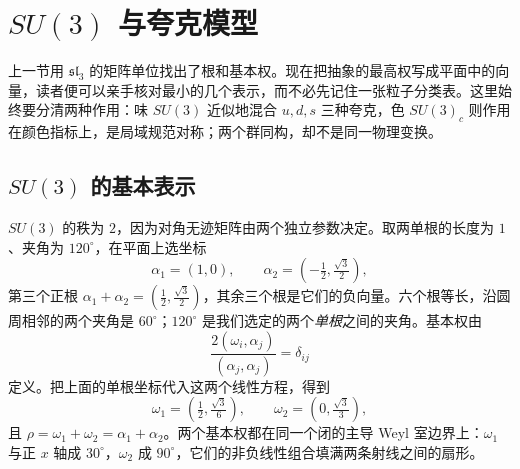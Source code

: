 \section{\texorpdfstring{$SU(3)$ 与夸克模型}{SU(3) 与夸克模型}}
\label{chap:su3-quarks}

上一节用 \(\mathfrak{sl}_3\) 的矩阵单位找出了根和基本权。现在把抽象的最高权写成平面中的向量，读者便可以亲手核对最小的几个表示，而不必先记住一张粒子分类表。这里始终要分清两种作用：味 \(SU(3)\) 近似地混合 \(u,d,s\) 三种夸克，色 \(SU(3)_c\) 则作用在颜色指标上，是局域规范对称；两个群同构，却不是同一物理变换。

\subsection{\texorpdfstring{$SU(3)$ 的基本表示}{SU(3) 的基本表示}}

\begin{definition}[$SU(3)$ 的根坐标与基本权]
$SU(3)$ 的秩为 $2$，因为对角无迹矩阵由两个独立参数决定。取两单根的长度为 $1$、夹角为 $120^\circ$，在平面上选坐标
\[
\alpha_1=(1,0),\qquad \alpha_2=\left(-\tfrac12,\tfrac{\sqrt3}{2}\right),
\]
第三个正根 $\alpha_1+\alpha_2=(\tfrac12,\tfrac{\sqrt3}{2})$，其余三个根是它们的负向量。六个根等长，沿圆周相邻的两个夹角是 $60^\circ$；$120^\circ$ 是我们选定的两个\emph{单根}之间的夹角。基本权由
\[
\frac{2(\omega_i,\alpha_j)}{(\alpha_j,\alpha_j)}=\delta_{ij}
\]
定义。把上面的单根坐标代入这两个线性方程，得到
\[
\omega_1=\left(\tfrac12,\tfrac{\sqrt3}{6}\right),\qquad
\omega_2=\left(0,\tfrac{\sqrt3}{3}\right),
\]
且 $\rho=\omega_1+\omega_2=\alpha_1+\alpha_2$。两个基本权都在同一个闭的主导 Weyl 室边界上：$\omega_1$ 与正 $x$ 轴成 $30^\circ$，$\omega_2$ 成 $90^\circ$，它们的非负线性组合填满两条射线之间的扇形。

\end{definition}

